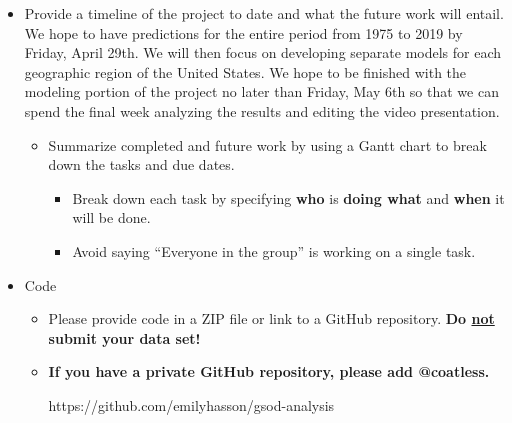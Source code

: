 \documentclass[conference]{IEEEtran}
\begin{document}
\begin{itemize}
\begin{itemize}
\begin{itemize}
      There were no tornados in our dataset and the model predicted no tornados. Therefore, the misclassification rate is zero.\footnote{https://github.com/emilyhasson/gsod-analysis/blob/main/gsod-analysis-part-1.ipynb} \\

      \item Regression should state the RMSE, MSE, or MAE.
    \end{itemize}
    \item Graphs
    \begin{itemize}
      \item Training and validation graphs based on the cost/loss function and evaluation metric (accuracy, F1, recall, RMSE, ...)
    \end{itemize}
  \end{itemize}
  \item Provide a timeline of the project to date and what the future work will entail. \\

  We hope to have predictions for the entire period from 1975 to 2019 by Friday, April 29th. We will then focus on developing separate models for each geographic region of the United States. We hope to be finished with the modeling portion of the project no later than Friday, May 6th so that we can spend the final week analyzing the results and editing the video presentation. \\

  \begin{itemize}
    \item Summarize completed and future work by using a Gantt chart to break down the tasks and due dates.
    \begin{itemize}
      \item Break down each task by specifying \textbf{who} is \textbf{doing what} and \textbf{when} it will be done.
      \item Avoid saying ``Everyone in the group'' is working on a single task.
    \end{itemize}
  \end{itemize}
  \item Code
  \begin{itemize}
    \item Please provide code in a ZIP file or link to a GitHub repository. \textbf{Do \underline{not} submit your data set!}
    \item \textbf{If you have a private GitHub repository, please add @coatless.}

    https://github.com/emilyhasson/gsod-analysis

  \end{itemize}
\end{itemize}
\end{document}

